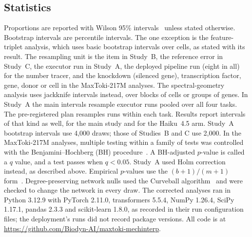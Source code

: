 \subsection*{Statistics}
Proportions are reported with Wilson 95\% intervals~\cite{wilson1927probable}
unless stated otherwise. Bootstrap intervals are percentile intervals.
The one exception is the feature-triplet analysis, which uses basic
bootstrap intervals over cells, as stated with its result. The resampling
unit is the item in Study~B, the reference error in Study~C, the executor run in Study~A, the
deployed pipeline run (eight in all) for the number tracer, and the knockdown
(silenced gene), transcription factor, gene, donor or cell in the
MaxToki-217M analyses. The spectral-geometry analysis uses jackknife
intervals instead, over blocks of cells or groups of genes. In Study~A
the main intervals resample executor runs pooled over all four tasks. The
pre-registered plan resamples runs within each task. Results report
intervals of that kind as well, for the main study and for the Haiku~4.5
arm. Study~A bootstrap intervals use 4,000 draws; those of Studies~B and
C use 2,000. In the MaxToki-217M analyses, multiple testing within a
family of tests was controlled with the Benjamini--Hochberg (BH)
procedure~\cite{benjamini1995fdr}. A BH-adjusted $p$-value is called a
$q$ value, and a test passes when $q < 0.05$. Study~A used Holm
correction instead, as described above. Empirical $p$-values use the
$(b+1)/(m+1)$ form~\cite{phipson2010permp}. Degree-preserving network
nulls used the Curveball algorithm~\cite{strona2014curveball} and were
checked to change the network in every draw. The corrected analyses ran
in Python 3.12.9 with PyTorch 2.11.0, transformers 5.5.4, NumPy 1.26.4,
SciPy 1.17.1, pandas 2.3.3 and scikit-learn 1.8.0, as recorded in their
run configuration files; the deployment's runs did not record package
versions. All code is at
\url{https://github.com/Biodyn-AI/maxtoki-mechinterp}.

